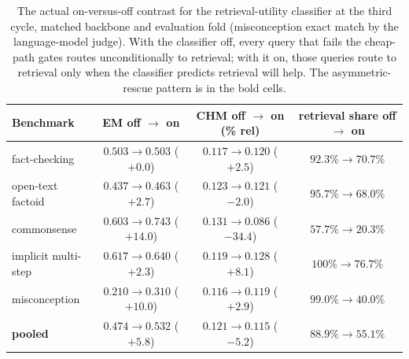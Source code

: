 \begin{table}[htbp]
\centering
\small
\begin{tabular}{@{}lccc@{}}
\toprule
\textbf{Benchmark} & \textbf{EM off $\to$ on} & \textbf{CHM off $\to$ on (\% rel)} & \textbf{retrieval share off $\to$ on} \\
\midrule
fact-checking      & $0.503 \to 0.503$ ($+0.0$) & $0.117 \to 0.120$ ($+2.5$)  & $92.3\% \to 70.7\%$ \\
open-text factoid  & $0.437 \to 0.463$ ($+2.7$) & $0.123 \to 0.121$ ($-2.0$)  & $95.7\% \to 68.0\%$ \\
commonsense        & $0.603 \to \mathbf{0.743}$ ($\mathbf{+14.0}$) & $0.131 \to \mathbf{0.086}$ ($\mathbf{-34.4}$) & $57.7\% \to 20.3\%$ \\
implicit multi-step& $0.617 \to 0.640$ ($+2.3$) & $0.119 \to 0.128$ ($+8.1$)  & $100\% \to 76.7\%$ \\
misconception      & $0.210 \to \mathbf{0.310}$ ($\mathbf{+10.0}$) & $0.116 \to 0.119$ ($+2.9$) & $99.0\% \to \mathbf{40.0\%}$ \\
\midrule
\textbf{pooled}    & $\mathbf{0.474 \to 0.532}$ ($\mathbf{+5.8}$) & $\mathbf{0.121 \to 0.115}$ ($\mathbf{-5.2}$) & $\mathbf{88.9\% \to 55.1\%}$ \\
\bottomrule
\end{tabular}
\caption[The retrieval-utility classifier, on versus off]{The actual on-versus-off
contrast for the retrieval-utility classifier at the third cycle, matched backbone and
evaluation fold (misconception exact match by the language-model judge). With the
classifier off, every query that fails the cheap-path gates routes unconditionally to
retrieval; with it on, those queries route to retrieval only when the classifier
predicts retrieval will help. The asymmetric-rescue pattern is in the bold cells.}
\label{tab:abl-ruc}
\end{table}


